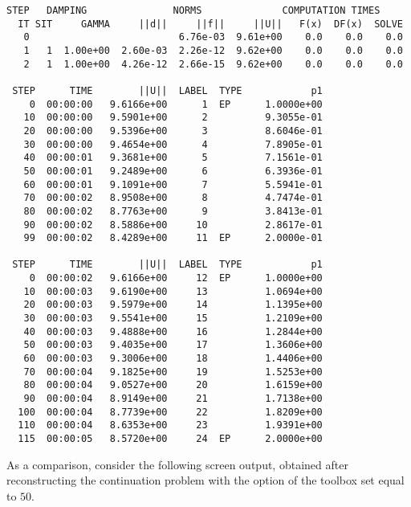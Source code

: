 \begin{lstlisting}[language=coco-highlight]
    STEP   DAMPING               NORMS              COMPUTATION TIMES
  IT SIT     GAMMA     ||d||     ||f||     ||U||   F(x)  DF(x)  SOLVE
   0                          6.76e-03  9.61e+00    0.0    0.0    0.0
   1   1  1.00e+00  2.60e-03  2.26e-12  9.62e+00    0.0    0.0    0.0
   2   1  1.00e+00  4.26e-12  2.66e-15  9.62e+00    0.0    0.0    0.0

 STEP      TIME        ||U||  LABEL  TYPE            p1
    0  00:00:00   9.6166e+00      1  EP      1.0000e+00
   10  00:00:00   9.5901e+00      2          9.3055e-01
   20  00:00:00   9.5396e+00      3          8.6046e-01
   30  00:00:00   9.4654e+00      4          7.8905e-01
   40  00:00:01   9.3681e+00      5          7.1561e-01
   50  00:00:01   9.2489e+00      6          6.3936e-01
   60  00:00:01   9.1091e+00      7          5.5941e-01
   70  00:00:02   8.9508e+00      8          4.7474e-01
   80  00:00:02   8.7763e+00      9          3.8413e-01
   90  00:00:02   8.5886e+00     10          2.8617e-01
   99  00:00:02   8.4289e+00     11  EP      2.0000e-01

 STEP      TIME        ||U||  LABEL  TYPE            p1
    0  00:00:02   9.6166e+00     12  EP      1.0000e+00
   10  00:00:03   9.6190e+00     13          1.0694e+00
   20  00:00:03   9.5979e+00     14          1.1395e+00
   30  00:00:03   9.5541e+00     15          1.2109e+00
   40  00:00:03   9.4888e+00     16          1.2844e+00
   50  00:00:03   9.4035e+00     17          1.3606e+00
   60  00:00:03   9.3006e+00     18          1.4406e+00
   70  00:00:04   9.1825e+00     19          1.5253e+00
   80  00:00:04   9.0527e+00     20          1.6159e+00
   90  00:00:04   8.9149e+00     21          1.7138e+00
  100  00:00:04   8.7739e+00     22          1.8209e+00
  110  00:00:04   8.6353e+00     23          1.9391e+00
  115  00:00:05   8.5720e+00     24  EP      2.0000e+00
\end{lstlisting}
 As a comparison, consider the following screen output, obtained after reconstructing the continuation problem with the  option of the  toolbox set equal to $50$.
